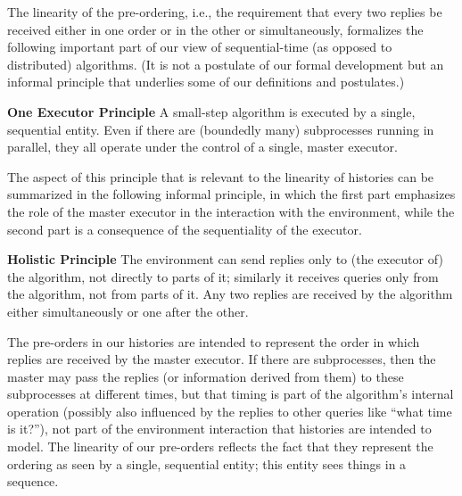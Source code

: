 \documentclass{LMCS}
\theoremstyle{definition}
\newenvironment{unn}[1]{\bigskip\noindent\textbf{#1}\quad}{\par\bigskip}
\begin{document}
The linearity of the pre-ordering, i.e., the requirement that every
two replies be received either in one order or in the other or
simultaneously, formalizes the following important part of our view of
sequential-time (as opposed to distributed) algorithms.  (It is not a
postulate of our formal development but an informal principle that
underlies some of our definitions and postulates.)

\begin{unn}{One Executor Principle}
A small-step algorithm is executed by a single, sequential entity.
Even if there are (boundedly many) subprocesses running in parallel,
they all operate under the control of a single, master executor.
\end{unn}

The aspect of this principle that is relevant to the linearity of
histories can be summarized in the following informal principle, in
which the first part emphasizes the role of the master executor in the
interaction with the environment, while the second part is a
consequence of the sequentiality of the executor.

\begin{unn}{Holistic Principle}
The environment can send replies only to (the executor of) the
algorithm, not directly to parts of it; similarly it receives queries
only from the algorithm, not from parts of it.  Any two replies are
received by the algorithm either simultaneously or one after the
other.
\end{unn}

The pre-orders in our histories are intended to represent the order in
which replies are received by the master executor.  If there are
subprocesses, then the master may pass the replies (or information
derived from them) to these subprocesses at different times, but that
timing is part of the algorithm's internal operation (possibly also
influenced by the replies to other queries like ``what time is it?''),
not part of the environment interaction that histories are intended to
model.  The linearity of our pre-orders reflects the fact that they
represent the ordering as seen by a single, sequential entity; this
entity sees things in a sequence.
\end{document}
